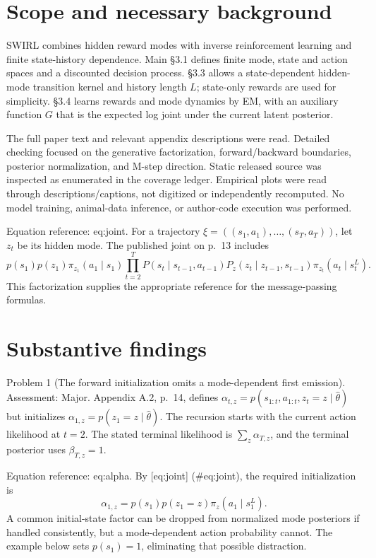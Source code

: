 \documentclass[10pt]{article}
\begin{document}
\section*{Scope and necessary background}
SWIRL combines hidden reward modes with inverse reinforcement learning and finite state-history dependence. Main §3.1 defines finite mode, state and action spaces and a discounted decision process. §3.3 allows a state-dependent hidden-mode transition kernel and history length \(L\); state-only rewards are used for simplicity. §3.4 learns rewards and mode dynamics by EM, with an auxiliary function \(G\) that is the expected log joint under the current latent posterior.\par
The full paper text and relevant appendix descriptions were read. Detailed checking focused on the generative factorization, forward/backward boundaries, posterior normalization, and M-step direction. Static released source was inspected as enumerated in the coverage ledger. Empirical plots were read through descriptions/captions, not digitized or independently recomputed. No model training, animal-data inference, or author-code execution was performed.\par
Equation reference: eq:joint. For a trajectory \(\xi=((s_1,a_1),\ldots,(s_T,a_T))\), let \(z_t\) be its hidden mode. The published joint on p. 13 includes \[
p(s_1)p(z_1)\pi_{z_1}(a_1\mid s_1)
 \prod_{t=2}^{T}
 P(s_t\mid s_{t-1},a_{t-1})
 P_z(z_t\mid z_{t-1},s_{t-1})
 \pi_{z_t}(a_t\mid s_t^L).\] This factorization supplies the appropriate reference for the message-passing formulas.\par
\section*{Substantive findings}
Problem 1 (The forward initialization omits a mode-dependent first emission).  Assessment: Major. Appendix A.2, p. 14, defines \(\alpha_{t,z}=p(s_{1:t},a_{1:t},z_t=z\mid\widehat\theta)\) but initializes \(\alpha_{1,z}=p(z_1=z\mid\widehat\theta)\). The recursion starts with the current action likelihood at \(t=2\). The stated terminal likelihood is \(\sum_z\alpha_{T,z}\), and the terminal posterior uses \(\beta_{T,z}=1\).\par
Equation reference: eq:alpha. By [eq:joint] (\#eq:joint), the required initialization is \[
\alpha_{1,z}=p(s_1)p(z_1=z)\pi_z(a_1\mid s_1^L).\] A common initial-state factor can be dropped from normalized mode posteriors if handled consistently, but a mode-dependent action probability cannot. The example below sets \(p(s_1)=1\), eliminating that possible distraction.\par
\end{document}
